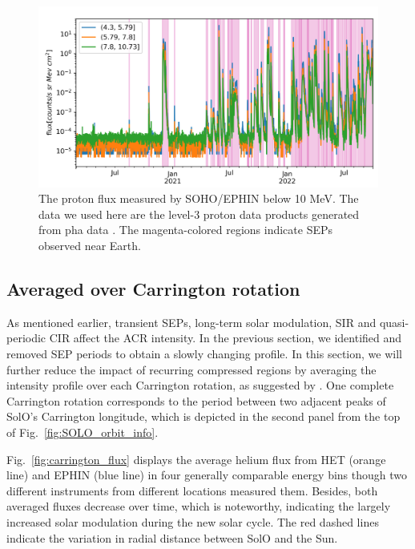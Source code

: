 \begin{figure}
    \centering
    \includegraphics[width = \textwidth]{images/ACR/SOLO-EPHIN-l3i-log2+6-proton-6H-V2.png}
    \caption[The proton intensity profile observed by \ac{EPHIN}]{The proton flux measured by \ac{SOHO}/\ac{EPHIN} below 10 MeV. The data we used here are the level-3 proton data products generated from pha data \citep{kuehl2020JSWSC}. The magenta-colored regions indicate \acp{SEP} observed near Earth.}
    \label{Fig:SOHO_EPHIN_Proton_flux}
\end{figure}

\subsection*{Averaged over Carrington rotation}

As mentioned earlier, transient \acp{SEP}, long-term solar modulation, \acs{SIR} and quasi-periodic \acs{CIR} affect the \ac{ACR} intensity. In the previous section, we identified and removed \ac{SEP} periods to obtain a slowly changing profile. In this section, we will further reduce the impact of recurring compressed regions by averaging the intensity profile over each Carrington rotation, as suggested by \citet{Rankin2021ApJ}. One complete Carrington rotation corresponds to the period between two adjacent peaks of \ac{SolO}'s Carrington longitude, which is depicted in the second panel from the top of Fig.~\ref{fig:SOLO_orbit_info}.


Fig.~\ref{fig:carrington_flux} displays the average helium flux from \ac{HET} (orange line) and \ac{EPHIN} (blue line) in four generally comparable energy bins though two different instruments from different locations measured them. Besides, both averaged fluxes decrease over time, which is noteworthy, indicating the largely increased solar modulation during the new solar cycle. The red dashed lines indicate the variation in radial distance between \ac{SolO} and the Sun. 

